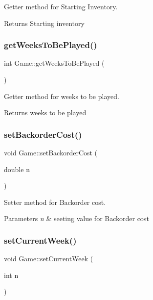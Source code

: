 Getter method for Starting Inventory. 

\begin{DoxyReturn}{Returns}
Starting inventory 
\end{DoxyReturn}
\mbox{\label{class_game_ad9d402aa7fdf97b4cbfa9e8e04301da0}} 
\subsubsection{\texorpdfstring{get\+Weeks\+To\+Be\+Played()}{getWeeksToBePlayed()}}
{\footnotesize\ttfamily int Game\+::get\+Weeks\+To\+Be\+Played (\begin{DoxyParamCaption}{ }\end{DoxyParamCaption})}



Getter method for weeks to be played. 

\begin{DoxyReturn}{Returns}
weeks to be played 
\end{DoxyReturn}
\mbox{\label{class_game_a6526b895b01b619358918e5276314f43}} 
\subsubsection{\texorpdfstring{set\+Backorder\+Cost()}{setBackorderCost()}}
{\footnotesize\ttfamily void Game\+::set\+Backorder\+Cost (\begin{DoxyParamCaption}\item[{double}]{n }\end{DoxyParamCaption})}



Setter method for Backorder cost. 


\begin{DoxyParams}{Parameters}
{\em n} & seeting value for Backorder cost \\
\hline
\end{DoxyParams}
\mbox{\label{class_game_a5d7966304ef0340bc9c1586bcee55738}} 
\subsubsection{\texorpdfstring{set\+Current\+Week()}{setCurrentWeek()}}
{\footnotesize\ttfamily void Game\+::set\+Current\+Week (\begin{DoxyParamCaption}\item[{int}]{n }\end{DoxyParamCaption})}




